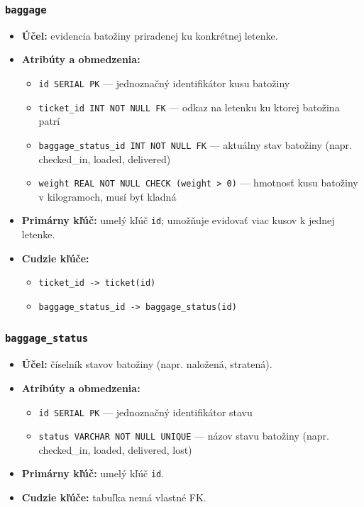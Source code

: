 \documentclass[11pt, a4paper]{article}
\begin{document}
\subsubsection*{\texttt{baggage}}
\begin{itemize}
    \item \textbf{Účel:} evidencia batožiny priradenej ku konkrétnej letenke.
    \item \textbf{Atribúty a obmedzenia:}
    \begin{itemize}
        \item \texttt{id SERIAL PK} --- jednoznačný identifikátor kusu batožiny
        \item \texttt{ticket\_id INT NOT NULL FK} --- odkaz na letenku ku ktorej batožina patrí
        \item \texttt{baggage\_status\_id INT NOT NULL FK} --- aktuálny stav batožiny (napr. checked\_in, loaded, delivered)
        \item \texttt{weight REAL NOT NULL CHECK (weight > 0)} --- hmotnosť kusu batožiny v kilogramoch, musí byť kladná
    \end{itemize}
    \item \textbf{Primárny kľúč:} umelý kľúč \texttt{id}; umožňuje evidovať viac kusov k jednej letenke.
    \item \textbf{Cudzie kľúče:} 
         \begin{itemize}
            \item \texttt{ticket\_id -> ticket(id)}
            \item \texttt{baggage\_status\_id -> baggage\_status(id)}
        \end{itemize}
\end{itemize}

\subsubsection*{\texttt{baggage\_status}}
\begin{itemize}
    \item \textbf{Účel:} číselník stavov batožiny (napr. naložená, stratená).
    \item \textbf{Atribúty a obmedzenia:}
    \begin{itemize}
        \item \texttt{id SERIAL PK} --- jednoznačný identifikátor stavu
        \item \texttt{status VARCHAR NOT NULL UNIQUE} --- názov stavu batožiny (napr. checked\_in, loaded, delivered, lost)
    \end{itemize}
    \item \textbf{Primárny kľúč:} umelý kľúč \texttt{id}.
    \item \textbf{Cudzie kľúče:} tabuľka nemá vlastné FK.
\end{itemize}
\end{document}

